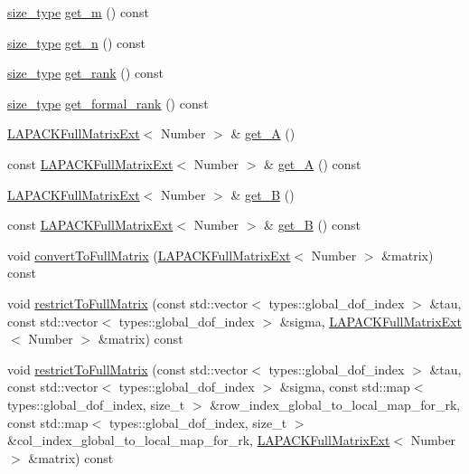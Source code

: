 \begin{DoxyCompactItemize}
\hyperlink{classRkMatrix_add060bfc3a4cc77f858c3d6dd58cadd5}{size\+\_\+type} \hyperlink{classRkMatrix_a58686c65ca8c952558eae4fa185e7d6a}{get\+\_\+m} () const
\item 
\hyperlink{classRkMatrix_add060bfc3a4cc77f858c3d6dd58cadd5}{size\+\_\+type} \hyperlink{classRkMatrix_a4f719c760482c2ab75cc5647277a9cdd}{get\+\_\+n} () const
\item 
\hyperlink{classRkMatrix_add060bfc3a4cc77f858c3d6dd58cadd5}{size\+\_\+type} \hyperlink{classRkMatrix_a1b2231c1e02862c91f4451e2b0a5fab4}{get\+\_\+rank} () const
\item 
\hyperlink{classRkMatrix_add060bfc3a4cc77f858c3d6dd58cadd5}{size\+\_\+type} \hyperlink{classRkMatrix_ae69122e3ee1c49a4fbe48cf3d7a20581}{get\+\_\+formal\+\_\+rank} () const
\item 
\hyperlink{classLAPACKFullMatrixExt}{L\+A\+P\+A\+C\+K\+Full\+Matrix\+Ext}$<$ Number $>$ \& \hyperlink{classRkMatrix_accfea435fd26c622e491bee475ae788c}{get\+\_\+A} ()
\item 
const \hyperlink{classLAPACKFullMatrixExt}{L\+A\+P\+A\+C\+K\+Full\+Matrix\+Ext}$<$ Number $>$ \& \hyperlink{classRkMatrix_a95e786794895f1ceae2e0f2880e105b3}{get\+\_\+A} () const
\item 
\hyperlink{classLAPACKFullMatrixExt}{L\+A\+P\+A\+C\+K\+Full\+Matrix\+Ext}$<$ Number $>$ \& \hyperlink{classRkMatrix_aca855d29d0dd3036ba75d0e3ca75d88e}{get\+\_\+B} ()
\item 
const \hyperlink{classLAPACKFullMatrixExt}{L\+A\+P\+A\+C\+K\+Full\+Matrix\+Ext}$<$ Number $>$ \& \hyperlink{classRkMatrix_a69695b04d890d753bd3343e4665ca0ba}{get\+\_\+B} () const
\item 
void \hyperlink{classRkMatrix_a384cdf3033d98f90b80d373add20b556}{convert\+To\+Full\+Matrix} (\hyperlink{classLAPACKFullMatrixExt}{L\+A\+P\+A\+C\+K\+Full\+Matrix\+Ext}$<$ Number $>$ \&matrix) const
\item 
void \hyperlink{classRkMatrix_a5305306386e47bcded819ce8d7f7935c}{restrict\+To\+Full\+Matrix} (const std\+::vector$<$ types\+::global\+\_\+dof\+\_\+index $>$ \&tau, const std\+::vector$<$ types\+::global\+\_\+dof\+\_\+index $>$ \&sigma, \hyperlink{classLAPACKFullMatrixExt}{L\+A\+P\+A\+C\+K\+Full\+Matrix\+Ext}$<$ Number $>$ \&matrix) const
\item 
void \hyperlink{classRkMatrix_a0c529b22a8a38c4046a93c4a16ad39ca}{restrict\+To\+Full\+Matrix} (const std\+::vector$<$ types\+::global\+\_\+dof\+\_\+index $>$ \&tau, const std\+::vector$<$ types\+::global\+\_\+dof\+\_\+index $>$ \&sigma, const std\+::map$<$ types\+::global\+\_\+dof\+\_\+index, size\+\_\+t $>$ \&row\+\_\+index\+\_\+global\+\_\+to\+\_\+local\+\_\+map\+\_\+for\+\_\+rk, const std\+::map$<$ types\+::global\+\_\+dof\+\_\+index, size\+\_\+t $>$ \&col\+\_\+index\+\_\+global\+\_\+to\+\_\+local\+\_\+map\+\_\+for\+\_\+rk, \hyperlink{classLAPACKFullMatrixExt}{L\+A\+P\+A\+C\+K\+Full\+Matrix\+Ext}$<$ Number $>$ \&matrix) const

\end{DoxyCompactItemize}
